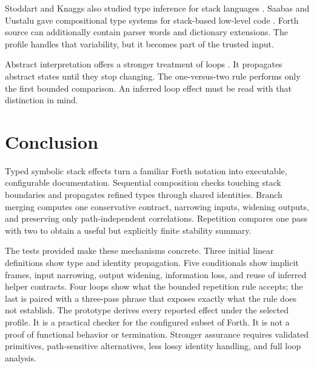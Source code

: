 \documentclass[11pt,a4paper]{article}
\begin{document}
Stoddart and Knaggs also studied type inference for stack languages
\cite{stoddart1991}.  Saabas and Uustalu gave compositional type systems for
stack-based low-level code \cite{saabas2006}.  Forth source can additionally
contain parser words and dictionary extensions.  The profile handles that
variability, but it becomes part of the trusted input.

Abstract interpretation offers a stronger treatment of loops
\cite{cousot1977}.  It propagates abstract states until they stop changing.
The one-versus-two rule performs only the first bounded comparison.  An
inferred loop effect must be read with that distinction in mind.

\section{Conclusion}
\leavevmode\par\vspace{-\baselineskip}
Typed symbolic stack effects turn a familiar Forth notation into executable,
configurable documentation.  Sequential composition checks touching stack
boundaries and propagates refined types through shared identities.  Branch
merging computes one conservative contract, narrowing inputs, widening outputs,
and preserving only path-independent correlations.  Repetition compares one
pass with two to obtain a useful but explicitly finite stability summary.

The tests provided make these mechanisms concrete.  Three initial linear
definitions show type and identity propagation.  Five conditionals show
implicit frames, input narrowing, output widening, information loss, and reuse
of inferred helper contracts.  Four loops show what the bounded repetition
rule accepts; the last is paired with a three-pass phrase that exposes exactly
what the rule does not establish.  The prototype derives every reported effect
under the selected profile.  It is a practical checker for the configured
subset of Forth.
It is not a proof of functional behavior or termination.  Stronger assurance
requires validated primitives, path-sensitive alternatives, less lossy
identity handling, and full loop analysis.
\end{document}
